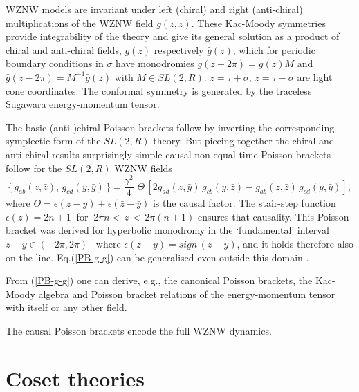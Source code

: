 \documentclass[a4paper,12]{article}
\begin{document}
WZNW models are invariant under left (chiral) and right (anti-chiral)
multiplications of the WZNW field $g(z,\bar z)$. These Kac-Moody
symmetries provide integrability of the theory and give its general
solution as a product of chiral and anti-chiral fields, $g(z)$
respectively $\bar g(\bar z)$, which for periodic boundary conditions
in $\sigma$ have monodromies $g(z+2\pi)=g(z)M$ and $\bar g(\bar z
-2\pi)=M^{-1}\bar g(\bar z)$ with $M\in SL(2,R)$. $z=\tau +\sigma$,
$\bar z=\tau -\sigma$ are light cone coordinates.  The conformal
symmetry is generated by the traceless Sugawara energy-momentum tensor.

The basic (anti-)chiral Poisson brackets follow by inverting the
corresponding symplectic form of the $SL(2,R)$ theory. But piecing
together the chiral and anti-chiral results surprisingly simple causal
non-equal time Poisson brackets follow for the $SL(2,R)$ WZNW fields 
\cite{FJW2}
\begin{equation}\label{PB-g-g}
\{\,g_{ab}(z,\bar z),\, g_{cd}(y,\bar y)\,\}=\frac{\gamma^2}{4}\,
\,\Theta\,[2 g_{ad}(z,\bar y)\,g_{cb}(y,\bar z)-
g_{ab}(z,\bar z)\,g_{cd}(y,\bar y)],
\end{equation}
where $\Theta =\epsilon(z-y)+\epsilon(\bar z-\bar y)$ is the causal
factor.  The stair-step function $\epsilon (z)= 2n+1~$ for $~2\pi n
<\,z\,<\, 2\pi (n+1)$ ensures that causality.  This Poisson bracket
was derived for hyperbolic monodromy in the `fundamental' interval
$z-y\in(-2\pi, 2\pi)$ \, where $\epsilon(z-y)=sign\,(z-y)$, and it
holds therefore also on the line. Eq.(\ref{PB-g-g}) can be
generalised even outside this domain \cite{JW}.

From (\ref{PB-g-g}) one can derive, e.g., the canonical Poisson
brackets, the Kac-Moody algebra and
Poisson bracket relations of the energy-momentum
tensor with itself or any other field. 

The causal Poisson brackets encode the full WZNW dynamics.

\section{Coset theories}
\end{document}

